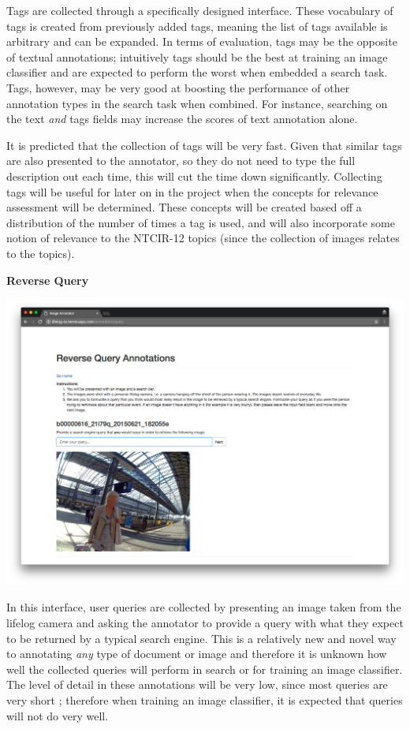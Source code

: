 Tags are collected through a specifically designed interface. These vocabulary of tags is created from previously added tags, meaning the list of tags available is arbitrary and can be expanded. In terms of evaluation, tags may be the opposite of textual annotations; intuitively tags should be the best at training an image classifier and are expected to perform the worst when embedded a search task. Tags, however, may be very good at boosting the performance of other annotation types in the search task when combined. For instance, searching on the text \textit{and} tags fields may increase the scores of text annotation alone.

It is predicted that the collection of tags will be very fast. Given that similar tags are also presented to the annotator, so they do not need to type the full description out each time, this will cut the time down significantly. Collecting tags will be useful for later on in the project when the concepts for relevance assessment will be determined. These concepts will be created based off a distribution of the number of times a tag is used, and will also incorporate some notion of relevance to the NTCIR-12 topics (since the collection of images relates to the topics).

\newpage
\textbf{Reverse Query}

\includegraphics[width=\textwidth]{images/query-interface}

In this interface, user queries are collected by presenting an image taken from the lifelog camera and asking the annotator to provide a query with what they expect to be returned by a typical search engine. This is a relatively new and novel way to annotating \textit{any} type of document or image  and therefore it is unknown how well the collected queries will perform in search or for training an image classifier. The level of detail in these annotations will be very low, since most queries are very short ; therefore when training an image classifier, it is expected that queries will not do very well.

